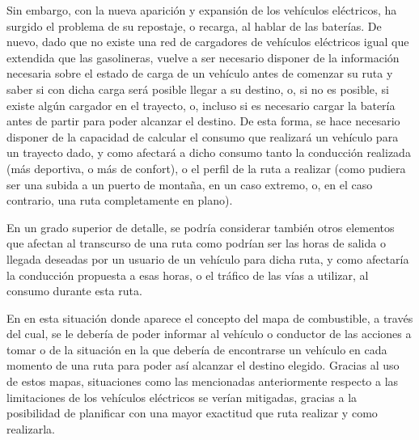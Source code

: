 \documentclass[11pt,spanish,listoffigures,listoftables]{tfgetsinf}
\begin{document}
Sin embargo, con la nueva aparición y expansión de los vehículos eléctricos, ha surgido el problema de su repostaje, o recarga, al hablar de las baterías. De nuevo, dado que no existe una red de cargadores de vehículos eléctricos igual que extendida que las gasolineras, vuelve a ser necesario disponer de la información necesaria sobre el estado de carga de un vehículo antes de comenzar su ruta y saber si con dicha carga será posible llegar a su destino, o, si no es posible, si existe algún cargador en el trayecto, o, incluso si es necesario cargar la batería antes de partir para poder alcanzar el destino. De esta forma, se hace necesario disponer de la capacidad de calcular el consumo que realizará un vehículo para un trayecto dado, y como afectará a dicho consumo tanto la conducción realizada (más deportiva, o más de confort), o el perfil de la ruta a realizar (como pudiera ser una subida a un puerto de montaña, en un caso extremo, o, en el caso contrario, una ruta completamente en plano).

En un grado superior de detalle, se podría considerar también otros elementos que afectan al transcurso de una ruta como podrían ser las horas de salida o llegada deseadas por un usuario de un vehículo para dicha ruta, y como afectaría la conducción propuesta a esas horas, o el tráfico de las vías a utilizar, al consumo durante esta ruta.

En en esta situación donde aparece el concepto del mapa de combustible, a través del cual, se le debería de poder informar al vehículo o conductor de las acciones a tomar o de la situación en la que debería de encontrarse un vehículo en cada momento de una ruta para poder así alcanzar el destino elegido. Gracias al uso de estos mapas, situaciones como las mencionadas anteriormente respecto a las limitaciones de los vehículos eléctricos se verían mitigadas, gracias a la posibilidad de planificar con una mayor exactitud que ruta realizar y como realizarla.

\end{document}
